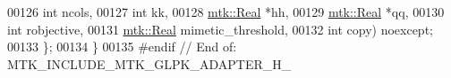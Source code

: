 \begin{DoxyCode}
00126                                           \textcolor{keywordtype}{int} ncols,
00127                                           \textcolor{keywordtype}{int} kk,
00128                                           \hyperlink{group__c01-roots_gac080bbbf5cbb5502c9f00405f894857d}{mtk::Real} *hh,
00129                                           \hyperlink{group__c01-roots_gac080bbbf5cbb5502c9f00405f894857d}{mtk::Real} *qq,
00130                                           \textcolor{keywordtype}{int} robjective,
00131                                           \hyperlink{group__c01-roots_gac080bbbf5cbb5502c9f00405f894857d}{mtk::Real} mimetic\_threshold,
00132                                           \textcolor{keywordtype}{int} copy) noexcept;
00133 \};
00134 \}
00135 \textcolor{preprocessor}{#endif  // End of: MTK\_INCLUDE\_MTK\_GLPK\_ADAPTER\_H\_}
\end{DoxyCode}
